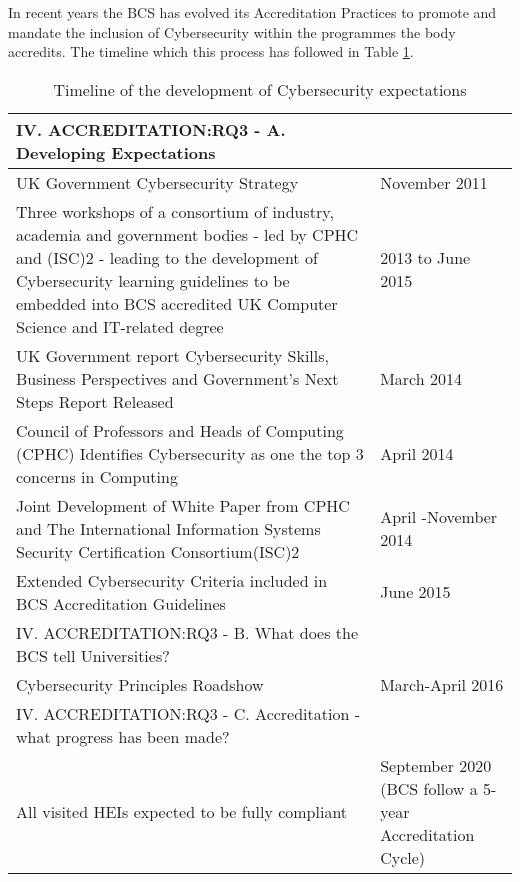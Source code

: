 \documentclass[conference]{IEEEtran}
\begin{document}
In recent years the BCS has evolved its Accreditation Practices to promote and mandate the inclusion of Cybersecurity within the programmes the body accredits. The timeline which this process has followed in Table \ref{table:1}.
\begin{center}
  \begin{table}[h!]
  \begin{tabular}{ | p{6cm} |p{1.5cm} |}
    \hline
    IV. ACCREDITATION:RQ3 - A. Developing Expectations &   \\ \hline
    UK Government Cybersecurity Strategy \cite{UKCabinetOffice} & November 2011 \\ \hline
    Three workshops of a consortium of industry, academia and government bodies - led by CPHC and (ISC)2 - leading to the development of Cybersecurity learning guidelines to be embedded into BCS accredited UK Computer Science and IT-related degree \cite{CPHCISC2}  & 2013 to June 2015 \\ \hline
    UK Government report Cybersecurity Skills, Business Perspectives and Government's Next Steps Report Released \cite{UKCabinetOffice2014} & March 2014  \\ \hline
    Council of Professors and Heads of Computing (CPHC) Identifies Cybersecurity as one the top 3 concerns in Computing & April 2014 \\ \hline
    Joint Development of White Paper from CPHC and The International Information Systems Security Certification Consortium(ISC)2 \cite{CPHCISC2014} & April -November 2014 \\ \hline
    Extended Cybersecurity Criteria included in BCS Accreditation Guidelines \cite{BCS2018a}& June 2015 \\
    \hline
    IV. ACCREDITATION:RQ3 - B. What does the BCS tell Universities? & \\ \hline
    Cybersecurity Principles Roadshow & March-April 2016 \\ \hline
    IV. ACCREDITATION:RQ3 - C. Accreditation - what progress has been made? &  \\ \hline
    All visited HEIs expected to be fully compliant & September 2020 (BCS follow a 5-year Accreditation Cycle)  \\ \hline
  \end{tabular}
  \caption{Timeline of the development of Cybersecurity expectations}
  \label{table:1}
  \end{table}
\end{center}
\end{document}
